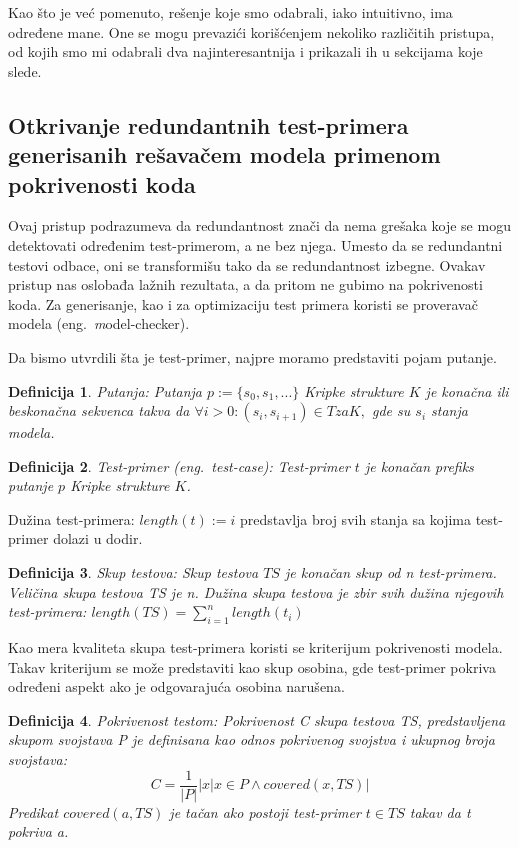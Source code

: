 \documentclass[a4paper]{article}
\newtheorem{definition}{Definicija}[section]
\begin{document}
Kao što je već pomenuto, rešenje koje smo odabrali, iako intuitivno, ima određene mane. One se mogu prevazići korišćenjem nekoliko različitih pristupa, od kojih smo mi odabrali dva najinteresantnija i prikazali ih u sekcijama koje slede.

\subsection{Otkrivanje redundantnih test-primera generisanih rešavačem modela primenom pokrivenosti koda}
\label{subsec:prvi}

Ovaj pristup\cite{prvinacin} podrazumeva da redundantnost znači da nema grešaka koje se mogu detektovati određenim test-primerom, a ne bez njega. Umesto da se redundantni testovi odbace, oni se transformišu tako da se redundantnost izbegne. Ovakav pristup nas oslobađa lažnih rezultata, a da pritom ne gubimo na pokrivenosti koda. Za generisanje, kao i za optimizaciju test primera koristi se proveravač modela (eng.~{\textit model-checker}).

Da bismo utvrdili šta je test-primer, najpre moramo predstaviti pojam putanje.

\begin{definition}{Putanja:}
Putanja $ p := \{s_0, s_1, ...\}$ Kripke strukture $K$ je konačna ili beskonačna sekvenca takva da $ \forall i > 0 : (s_i, s_{i+1}) \in T za K, $ gde su $ s_i $ stanja modela.
\end{definition}

\begin{definition}{Test-primer (eng.~{\textit test-case}):}
Test-primer $t$ je konačan prefiks putanje $p$ Kripke strukture $K$.
\end{definition}

Dužina test-primera: $ length(t) := i$ predstavlja broj svih stanja sa kojima test-primer dolazi u dodir.

\begin{definition}{Skup testova:}
Skup testova $TS$ je konačan skup od n test-primera. Veličina skupa testova TS je n. Dužina skupa testova je zbir svih dužina njegovih test-primera: $
    length(TS) = \sum_{i=1}^{n}length(t_i)$
\end{definition}

Kao mera kvaliteta skupa test-primera koristi se kriterijum pokrivenosti modela. Takav kriterijum se može predstaviti kao skup osobina, gde test-primer pokriva određeni aspekt ako je odgovarajuća osobina narušena.

\begin{definition}{Pokrivenost testom:}
Pokrivenost C skupa testova TS, predstavljena skupom svojstava P je definisana kao odnos pokrivenog svojstva i ukupnog broja svojstava:
\begin{equation}
    C = \frac{1}{|P|}|{x|x \in P \land covered(x,TS)}|
\end{equation}
Predikat $ covered(a, TS)$ je tačan ako postoji test-primer $ t \in TS$ takav da \textit{t} pokriva \textit{a}.
\end{definition}
\end{document}
